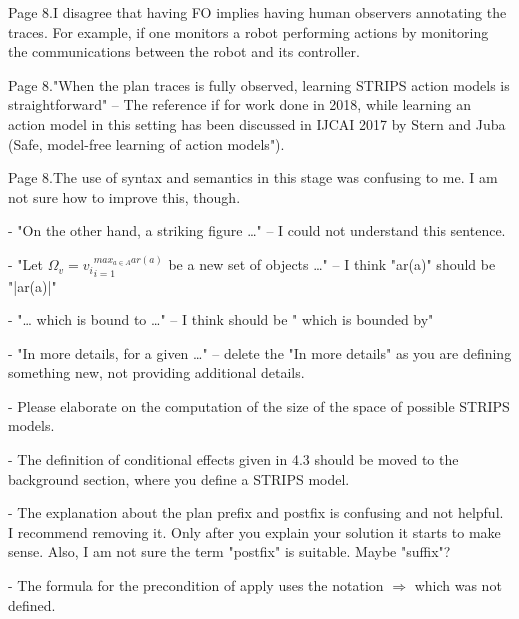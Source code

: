 \documentclass{article}
\begin{document}
\begin{mdframed}[hidealllines=true,backgroundcolor=gray!20]
  Page 8.I disagree that having FO implies having human observers annotating the traces. For example, if one monitors a robot performing actions by monitoring the communications between the robot and its controller.
\end{mdframed}

\begin{mdframed}[hidealllines=true,backgroundcolor=gray!20]
  Page 8."When the plan traces is fully observed, learning STRIPS action models is straightforward" – The reference if for work done in 2018, while learning an action model in this setting has been discussed in IJCAI 2017 by Stern and Juba (Safe, model-free learning of action models").
\end{mdframed}

\begin{mdframed}[hidealllines=true,backgroundcolor=gray!20]
  Page 8.The use of syntax and semantics in this stage was confusing to me. I am not sure how to improve this, though.
\end{mdframed}

\begin{mdframed}[hidealllines=true,backgroundcolor=gray!20]
-          "On the other hand, a striking figure …" – I could not understand this sentence.

-          "Let $\Omega_v = {v_i}_{i=1}^{max_{a\in A} ar(a)}$ be a new set of objects …" – I think "ar(a)" should be "|ar(a)|"

-          "… which is bound to …" – I think should be " which is bounded by"

-          "In more details, for a given …" – delete the "In more details" as you are defining something new, not providing additional details.

-          Please elaborate on the computation of the size of the space of possible STRIPS models.

-          The definition of conditional effects given in 4.3 should be moved to the background section, where you define a STRIPS model.

-          The explanation about the plan prefix and postfix is confusing and not helpful. I recommend removing it. Only after you explain your solution it starts to make sense. Also, I am not sure the term "postfix" is suitable. Maybe "suffix"?

-          The formula for the precondition of apply uses the notation $\Rightarrow$ which was not defined.
\end{mdframed}
\end{document}
